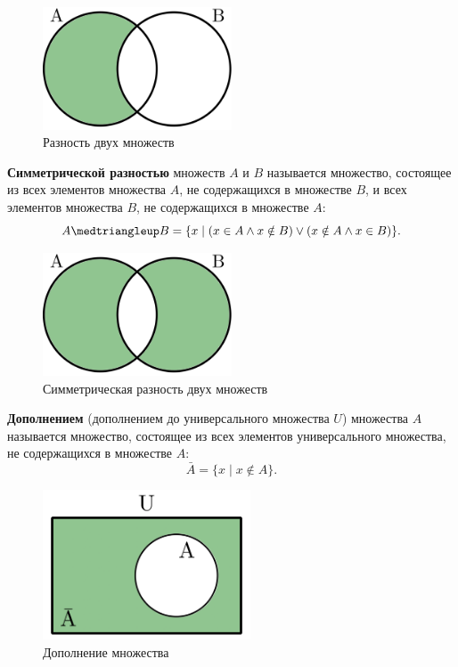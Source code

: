 \begin{figure}[H]
    \centering
    \includegraphics[width=0.5\textwidth]{images/set-difference.png}
    \caption{Разность двух множеств}
\end{figure}

\textbf{Симметрической разностью} множеств \(A\) и \(B\) называется множество, состоящее из всех элементов множества \(A\), не содержащихся в множестве \(B\), и всех элементов множества \(B\), не содержащихся в множестве \(A\):
\[
    A \symdiff B = \{x \mid (x \in A \land x \notin B) \lor (x \notin A \land x \in B)\}.
\]

\begin{figure}[H]
    \centering
    \includegraphics[width=0.5\textwidth]{images/set-sym-difference.png}
    \caption{Симметрическая разность двух множеств}
\end{figure}

\textbf{Дополнением} (дополнением до универсального множества \(U\)) множества \(A\) называется множество, состоящее из всех элементов универсального множества, не содержащихся в множестве \(A\):
\[
    \bar{A} = \{x \mid x \notin A\}.
\]

\begin{figure}[H]
    \centering
    \includegraphics[width=0.55\textwidth]{images/set-complement.png}
    \caption{Дополнение множества}
\end{figure}

